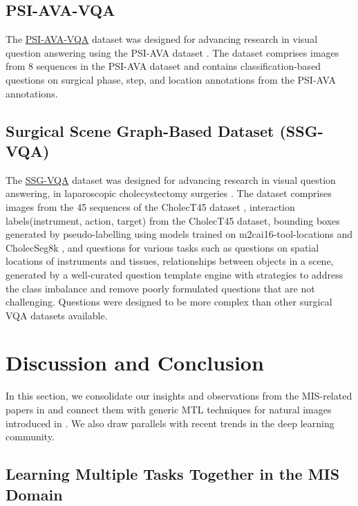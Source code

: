 \subsection{PSI-AVA-VQA}
The \href{https://github.com/lalithjets/SurgicalGPT}{PSI-AVA-VQA} dataset was designed for advancing research in visual question answering using the PSI-AVA dataset \citep{seenivasan2023surgicalgpt}. 
The dataset comprises images from 8 sequences in the PSI-AVA dataset and contains classification-based questions on surgical phase, step, and location annotations from the PSI-AVA annotations.

\subsection{Surgical Scene Graph-Based Dataset (SSG-VQA)}
The \href{https://github.com/CAMMA-public/SSG-VQA}{SSG-VQA} dataset was designed for advancing research in visual question answering, in laparoscopic cholecystectomy surgeries \citep{yuan2024advancing}. 
The dataset comprises images from the 45 sequences of the CholecT45 dataset \citep{NWOYE2022102433_rendevous}, interaction labels(\textlangle{}instrument, action, target\textrangle) from the CholecT45 dataset, bounding boxes generated by pseudo-labelling using models trained on m2cai16-tool-locations \citep{jin2018tool} and CholecSeg8k \citep{cholecseg8k}, and questions for various tasks such as questions on spatial locations of instruments and tissues, relationships between objects in a scene,  generated by a well-curated question template engine with strategies to address the class imbalance and remove poorly formulated questions that are not challenging. Questions were designed to be more complex than other surgical VQA datasets available. 



\section{Discussion and Conclusion} \label{sec::discussions_and_conclusions}
In this section, we consolidate our insights and observations from the MIS-related papers in  and connect them with generic MTL techniques for natural images introduced in .
We also draw parallels with recent trends in the deep learning community.

\subsection{Learning Multiple Tasks Together in the MIS Domain}

